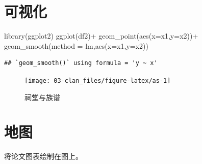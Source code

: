 \documentclass[
  oneside]{book}
\newenvironment{Shaded}{\begin{snugshade}}{\end{snugshade}}
\newcommand{\AttributeTok}[1]{\textcolor[rgb]{0.77,0.63,0.00}{#1}}
\newcommand{\FunctionTok}[1]{\textcolor[rgb]{0.00,0.00,0.00}{#1}}
\newcommand{\NormalTok}[1]{#1}
\newcommand{\OtherTok}[1]{\textcolor[rgb]{0.56,0.35,0.01}{#1}}
\newcommand{\SpecialCharTok}[1]{\textcolor[rgb]{0.00,0.00,0.00}{#1}}
\newcommand{\StringTok}[1]{\textcolor[rgb]{0.31,0.60,0.02}{#1}}
\begin{document}
\hypertarget{ux53efux89c6ux5316}{%
\section{可视化}\label{ux53efux89c6ux5316}}

\begin{Shaded}
\begin{Highlighting}[]
\FunctionTok{library}\NormalTok{(ggplot2)}
\FunctionTok{ggplot}\NormalTok{(df2)}\SpecialCharTok{+}
  \FunctionTok{geom\_point}\NormalTok{(}\FunctionTok{aes}\NormalTok{(}\AttributeTok{x=}\NormalTok{x1,}\AttributeTok{y=}\NormalTok{x2))}\SpecialCharTok{+}
  \FunctionTok{geom\_smooth}\NormalTok{(}\AttributeTok{method =} \StringTok{\textquotesingle{}lm\textquotesingle{}}\NormalTok{,}\FunctionTok{aes}\NormalTok{(}\AttributeTok{x=}\NormalTok{x1,}\AttributeTok{y=}\NormalTok{x2))}
\end{Highlighting}
\end{Shaded}

\begin{verbatim}
## `geom_smooth()` using formula = 'y ~ x'
\end{verbatim}

\begin{figure}

{\centering \texttt{[image: 03-clan\_files/figure-latex/as-1]} 

}

\caption{祠堂与族谱}\label{fig:as}
\end{figure}

\hypertarget{ux5730ux56fe}{%
\section{地图}\label{ux5730ux56fe}}

将论文图表绘制在图上。

\begin{Shaded}
\end{Shaded}
\end{document}
